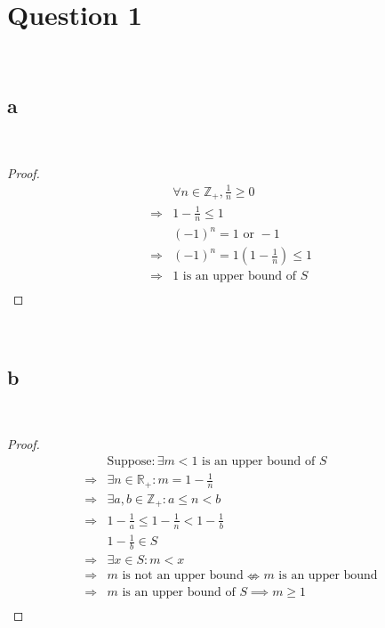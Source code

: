 \documentclass{article}
\begin{document}
\section*{Question 1}

~

\subsection*{a}

~

\begin{proof}
    \begin{align*}
        &\forall n\in \mathbb{Z} _+, \frac{1}{n}\geqslant0\\
        \Rightarrow&1-\frac{1}{n}\leqslant1\\
        &(-1)^n=1\text{ or }-1\\
        \Rightarrow&(-1)^n=1(1-\frac{1}{n})\leqslant 1\\
        \Rightarrow&1\text{ is an upper bound of }S\\
    \end{align*}
\end{proof}

~

\subsection*{b}

~

\begin{proof}
    \begin{align*}
        &\text{Suppose}:\exists m<1\text{ is an upper bound of }S\\
        \Rightarrow&\exists n\in \mathbb{R} _+:m= 1-\frac{1}{n}\\
        \Rightarrow&\exists a,b\in\mathbb{Z} _+:a\leqslant n< b\\
        \Rightarrow&1-\frac{1}{a}\leqslant 1-\frac{1}{n}< 1-\frac{1}{b}\\
        &1-\frac{1}{b}\in S\\
        \Rightarrow&\exists x\in S:m< x\\
        \Rightarrow&m\text{ is not an upper bound}\nLeftrightarrow m\text{ is an upper bound}\\
        \Rightarrow&m\text{ is an upper bound of }S\implies m\geqslant 1\\
    \end{align*}
\end{proof}
\end{document}
